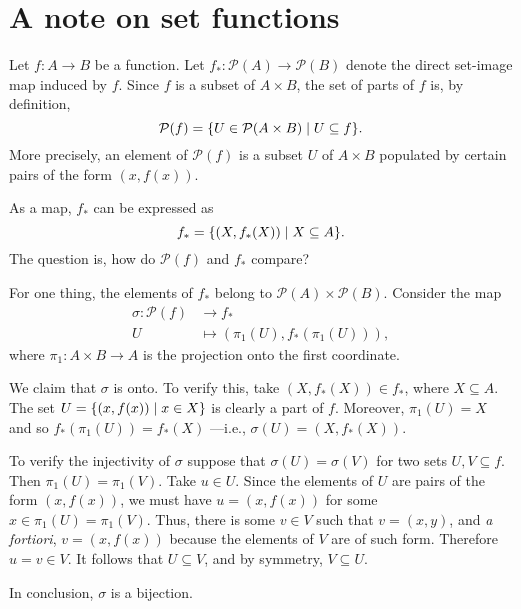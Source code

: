 \chapter{A note on set functions}

Let $f\colon A\to B$ be a function. Let $f_*\colon\mathcal P(A)\to\mathcal P(B)$ denote the direct set-image map induced by $f$. Since $f$ is a subset of $A\times B$, the set of parts of $f$ is, by definition,
$$
    \mathcal P(f) = \{U\in\mathcal P(A\times B)\mid U\subseteq f\}.
$$
More precisely, an element of $\mathcal P(f)$ is a subset $U$ of $A\times B$ populated by certain pairs of the form $(x,f(x))$.

As a map, $f_*$ can be expressed as
$$
    f_* = \{(X,f_*(X))\mid X\subseteq A\}.
$$
The question is, how do $\mathcal P(f)$ and $f_*$ compare?

For one thing, the elements of $f_*$ belong to $\mathcal P(A)\times\mathcal P(B)$. Consider the map
\begin{align*}
    \sigma\colon\mathcal P(f)&\to f_*\\
    U&\mapsto (\pi_1(U),f_*(\pi_1(U))),
\end{align*}
where $\pi_1\colon A\times B\to A$ is the projection onto the first coordinate.

We claim that $\sigma$ is onto. To verify this, take $(X,f_*(X))\in f_*$, where $X\subseteq A$. The set $U=\{(x,f(x))\mid x\in X\}$ is clearly a part of $f$. Moreover, $\pi_1(U)=X$ and so $f_*(\pi_1(U))=f_*(X)$ ---i.e., $\sigma(U)=(X,f_*(X))$.

To verify the injectivity of $\sigma$ suppose that $\sigma(U)=\sigma(V)$ for two sets $U,V\subseteq f$. Then $\pi_1(U)=\pi_1(V)$. Take $u\in U$. Since the elements of $U$ are pairs of the form $(x,f(x))$, we must have $u=(x,f(x))$ for some $x\in\pi_1(U)=\pi_1(V)$. Thus, there is some $v\in V$ such that $v=(x,y)$, and \textit{a fortiori}, $v=(x,f(x))$ because the elements of $V$ are of such form. Therefore $u=v\in V$. It follows that $U\subseteq V$, and by symmetry, $V\subseteq U$.

In conclusion, $\sigma$ is a bijection.


